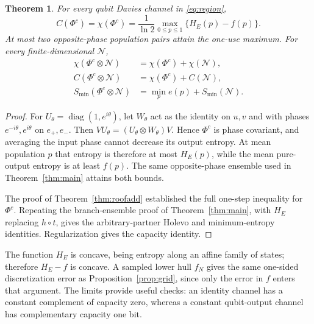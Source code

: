 \documentclass[11pt]{article}
\newtheorem{theorem}{Theorem}
\newcommand{\Smin}{S_{\min}}
\begin{document}
\begin{theorem}\label{thm:complement}
For every qubit Davies channel in \eqref{eq:region},
\[
 C(\Phi^c)=\chi(\Phi^c)=
       \frac1{\ln2}\max_{0\le p\le1}\{H_E(p)-f(p)\}.
\]
At most two opposite-phase population pairs attain the one-use maximum.
For every finite-dimensional $\mathcal N$,
\begin{align*}
 \chi(\Phi^c\otimes\mathcal N)&=\chi(\Phi^c)+\chi(\mathcal N),\\
 C(\Phi^c\otimes\mathcal N)&=\chi(\Phi^c)+C(\mathcal N),\\
 \Smin(\Phi^c\otimes\mathcal N)&=\min_p e(p)+\Smin(\mathcal N).
\end{align*}
\end{theorem}
\begin{proof}
For $U_\theta=\operatorname{diag}(1,e^{i\theta})$, let $W_\theta$ act as the
identity on $u,v$ and with phases $e^{-i\theta},e^{i\theta}$ on $e_+,e_-$.
Then $VU_\theta=(U_\theta\otimes W_\theta)V$. Hence $\Phi^c$ is phase
covariant, and averaging the input phase cannot decrease its output entropy.
At mean population $p$ that entropy is therefore at most $H_E(p)$, while
the mean pure-output entropy is at least $f(p)$. The same opposite-phase
ensemble used in Theorem~\ref{thm:main} attains both bounds.

The proof of Theorem~\ref{thm:roofadd} established the full one-step inequality
for $\Phi^c$. Repeating the branch-ensemble proof of Theorem~\ref{thm:main},
with $H_E$ replacing $h\circ t$, gives the arbitrary-partner Holevo and
minimum-entropy identities. Regularization gives the capacity identity.
\end{proof}
The function $H_E$ is concave, being entropy along an affine family of states;
therefore $H_E-f$ is concave. A sampled lower hull $f_N$ gives the same
one-sided discretization error as Proposition~\ref{prop:grid}, since only
the error in $f$ enters that argument. The limits provide useful checks:
an identity channel has a constant complement of capacity zero, whereas a
constant qubit-output channel has complementary capacity one bit.
\end{document}
